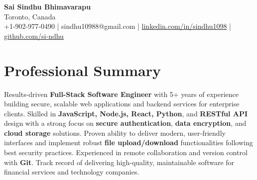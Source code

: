 \documentclass[letterpaper,11pt]{article}
\begin{document}
\begin{center}
  {\Large \textbf{Sai Sindhu Bhimavarapu}} \\
  Toronto, Canada \\
  +1-902-977-0490 \enspace | \enspace sindhu10988@gmail.com \enspace | \enspace \href{https://www.linkedin.com/in/sindhu1098/}{linkedin.com/in/sindhu1098} \enspace | \enspace \href{https://github.com/si-ndhu}{github.com/si-ndhu}
\end{center}

\section{Professional Summary}
  \begin{itemize}[leftmargin=0.15in, label={}]
    \small{\item{
     Results-driven \textbf{Full-Stack Software Engineer} with 5+ years of experience building secure, scalable web applications and backend services for enterprise clients. Skilled in \textbf{JavaScript, Node.js, React, Python}, and \textbf{RESTful API} design with a strong focus on \textbf{secure authentication}, \textbf{data encryption}, and \textbf{cloud storage} solutions. Proven ability to deliver modern, user-friendly interfaces and implement robust \textbf{file upload/download} functionalities following best security practices. Experienced in remote collaboration and version control with \textbf{Git}. Track record of delivering high-quality, maintainable software for financial services and technology companies.
    }}
  \end{itemize}
\vspace{-16pt}

\end{document}
